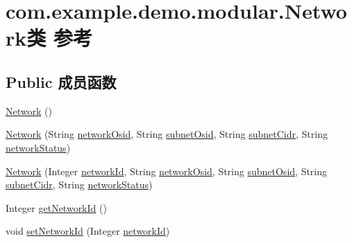 \hypertarget{classcom_1_1example_1_1demo_1_1modular_1_1_network}{}\section{com.\+example.\+demo.\+modular.\+Network类 参考}
\label{classcom_1_1example_1_1demo_1_1modular_1_1_network}
\subsection*{Public 成员函数}
\begin{DoxyCompactItemize}
\item 
\mbox{\hyperlink{classcom_1_1example_1_1demo_1_1modular_1_1_network_ab5b8791e965a8739b1fd4c8948859b41}{Network}} ()
\item 
\mbox{\hyperlink{classcom_1_1example_1_1demo_1_1modular_1_1_network_ae37a90a0742a39f30a810cb4e86a64f4}{Network}} (String \mbox{\hyperlink{classcom_1_1example_1_1demo_1_1modular_1_1_network_a653e6a71d84cc5a92ab6b4446c90b64d}{network\+Osid}}, String \mbox{\hyperlink{classcom_1_1example_1_1demo_1_1modular_1_1_network_a2f70a4f8f85e28c37af005fe18074deb}{subnet\+Osid}}, String \mbox{\hyperlink{classcom_1_1example_1_1demo_1_1modular_1_1_network_a77c09d06140f3d9047051d6a8033c416}{subnet\+Cidr}}, String \mbox{\hyperlink{classcom_1_1example_1_1demo_1_1modular_1_1_network_a9c13fc86c668e502aee81251ded19368}{network\+Status}})
\item 
\mbox{\hyperlink{classcom_1_1example_1_1demo_1_1modular_1_1_network_acf5d391f7ba6c0b9a9e9505f9d50ed2e}{Network}} (Integer \mbox{\hyperlink{classcom_1_1example_1_1demo_1_1modular_1_1_network_a4c184f144422efc3d30f15b2391cc150}{network\+Id}}, String \mbox{\hyperlink{classcom_1_1example_1_1demo_1_1modular_1_1_network_a653e6a71d84cc5a92ab6b4446c90b64d}{network\+Osid}}, String \mbox{\hyperlink{classcom_1_1example_1_1demo_1_1modular_1_1_network_a2f70a4f8f85e28c37af005fe18074deb}{subnet\+Osid}}, String \mbox{\hyperlink{classcom_1_1example_1_1demo_1_1modular_1_1_network_a77c09d06140f3d9047051d6a8033c416}{subnet\+Cidr}}, String \mbox{\hyperlink{classcom_1_1example_1_1demo_1_1modular_1_1_network_a9c13fc86c668e502aee81251ded19368}{network\+Status}})
\item 
Integer \mbox{\hyperlink{classcom_1_1example_1_1demo_1_1modular_1_1_network_a2f0769fe46ffdce991677bdda584a7e9}{get\+Network\+Id}} ()
\item 
void \mbox{\hyperlink{classcom_1_1example_1_1demo_1_1modular_1_1_network_adca89f57cd81663b630e8e073c70c4bd}{set\+Network\+Id}} (Integer \mbox{\hyperlink{classcom_1_1example_1_1demo_1_1modular_1_1_network_a4c184f144422efc3d30f15b2391cc150}{network\+Id}})

\end{DoxyCompactItemize}
